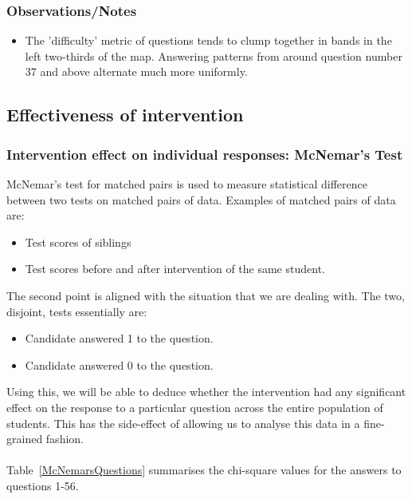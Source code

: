 \documentclass[10pt]{article}
\begin{document}
\subsubsection{Observations/Notes}
\begin{itemize}
\item The 'difficulty' metric of questions tends to clump together in bands in the left two-thirds of the map. Answering patterns from around question number 37 and above alternate much more uniformly.
\end{itemize}

\subsection{Effectiveness of intervention}
\label{sec:InterventionEffectiveness}
\subsubsection{Intervention effect on individual responses: McNemar's Test}
McNemar's test for matched pairs is used to measure statistical difference between two tests on matched pairs of data. Examples of matched pairs of data are:
\begin{itemize}
\item Test scores of siblings
\item Test scores before and after intervention of the same student.
\end{itemize}
The second point is aligned with the situation that we are dealing with. The two, disjoint, tests essentially are:
\begin{itemize}
\item Candidate answered 1 to the question.
\item Candidate answered 0 to the question.
\end{itemize}
Using this, we will be able to deduce whether the intervention had any significant effect on the response to a particular question across the entire population of students. This has the side-effect of allowing us to analyse this data in a fine-grained fashion.\\\\
Table~\ref{McNemarsQuestions} summarises the chi-square values for the answers to questions 1-56.
\end{document}
